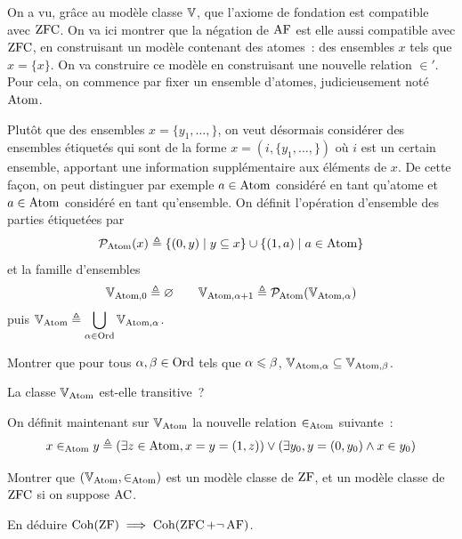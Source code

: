 \begin{problem}
  On a vu, grâce au modèle classe $\mathbb V$, que l'axiome de fondation est
  compatible avec $\operatorname{ZFC}$. On va ici montrer que la négation de $\operatorname{AF}$ est elle
  aussi compatible avec $\operatorname{ZFC}$, en construisant un modèle contenant des
  atomes~: des ensembles $x$ tels que $x = \{x\}$.
  On va construire ce modèle en construisant une nouvelle relation $\in'$. Pour
  cela, on commence par fixer un ensemble d'atomes, judicieusement noté $\operatorname{Atom}$.


  Plutôt que des ensembles $x = \{y_1,\ldots,\}$, on veut désormais considérer
  des \og ensembles étiquetés\fg{} qui sont de la forme
  $x = (i, \{y_1,\ldots,\})$ où $i$ est un certain ensemble, apportant une
  information supplémentaire aux éléments de $x$. De cette façon, on peut
  distinguer par exemple $a \in \operatorname{Atom}$ considéré en tant qu'atome et
  $a \in \operatorname{Atom}$ considéré en tant qu'ensemble. On définit l'opération d'ensemble
  des parties étiquetées par
  \[\mathcal{P}_{\operatorname{Atom}}(x) \triangleq
  \left\{ (0,y) \;\middle\vert\; y \subseteq x \right\}\cup \left\{ (1,a) \;\middle\vert\; a \in \operatorname{Atom} \right\}\]
  et la famille d'ensembles
  \[\mathbb V_{\operatorname{Atom},0} \triangleq \varnothing \qquad
  \mathbb V_{\operatorname{Atom},\alpha+1}\triangleq \mathcal{P}_{\operatorname{Atom}}(\mathbb V_{\operatorname{Atom},\alpha})\]
  puis $\displaystyle\mathbb V_{\operatorname{Atom}} \triangleq \bigcup_{\alpha\in\operatorname{Ord}}\mathbb V_{\operatorname{Atom},\alpha}$.
  \begin{pbQuest}
  \item Montrer que pour tous $\alpha,\beta\in\operatorname{Ord}$ tels que
    $\alpha \leqslant \beta$, $\mathbb V_{\operatorname{Atom},\alpha}\subseteq\mathbb V_{\operatorname{Atom},\beta}$.
  \item La classe $\mathbb V_{\operatorname{Atom}}$ est-elle transitive~?
  \end{pbQuest}

  On définit maintenant sur $\mathbb V_{\operatorname{Atom}}$ la nouvelle relation $\in_{\operatorname{Atom}}$
  suivante~:
  \[x \in_{\operatorname{Atom}} y \triangleq (\exists z\in\operatorname{Atom}, x = y = (1,z))\lor
  (\exists y_0, y = (0,y_0) \land x \in y_0)\]
  \begin{pbQuest}[resume]
  \item Montrer que $(\mathbb V_{\operatorname{Atom}},\in_{\operatorname{Atom}})$ est un modèle classe de $\operatorname{ZF}$, et
    un modèle classe de $\operatorname{ZFC}$ si on suppose $\operatorname{AC}$.
  \item En déduire $\operatorname{Coh}(\operatorname{ZF})\implies \operatorname{Coh}(\operatorname{ZFC} + \lnot\operatorname{AF})$.
  \end{pbQuest}



\end{problem}
